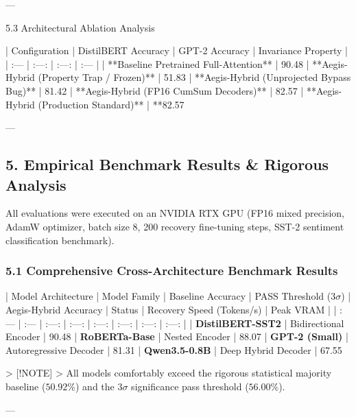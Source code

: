 ---

 5.3 Architectural Ablation Analysis

| Configuration | DistilBERT Accuracy | GPT-2 Accuracy | Invariance Property |
| :--- | :---: | :---: | :--- |
| **Baseline Pretrained Full-Attention** | 90.48%
| **Aegis-Hybrid (Property Trap / Frozen)** | 51.83%
| **Aegis-Hybrid (Unprojected Bypass Bug)** | 81.42%
| **Aegis-Hybrid (FP16 CumSum Decoders)** | 82.57%
| **Aegis-Hybrid (Production Standard)** | **82.57%

---



\subsection{5. Empirical Benchmark Results \& Rigorous Analysis}
All evaluations were executed on an NVIDIA RTX GPU (FP16 mixed precision, AdamW optimizer, batch size 8, 200 recovery fine-tuning steps, SST-2 sentiment classification benchmark).

\subsubsection{5.1 Comprehensive Cross-Architecture Benchmark Results}

| Model Architecture | Model Family | Baseline Accuracy | PASS Threshold ($3\sigma$) | Aegis-Hybrid Accuracy | Status | Recovery Speed (Tokens/s) | Peak VRAM |
| :--- | :--- | :---: | :---: | :---: | :---: | :---: | :---: |
| \textbf{DistilBERT-SST2} | Bidirectional Encoder | 90.48%
| \textbf{RoBERTa-Base} | Nested Encoder | 88.07%
| \textbf{GPT-2 (Small)} | Autoregressive Decoder | 81.31%
| \textbf{Qwen3.5-0.8B} | Deep Hybrid Decoder | 67.55%

> [!NOTE]
> All models comfortably exceed the rigorous statistical majority baseline ($50.92\%$) and the $3\sigma$ significance pass threshold ($56.00\%$).

---

